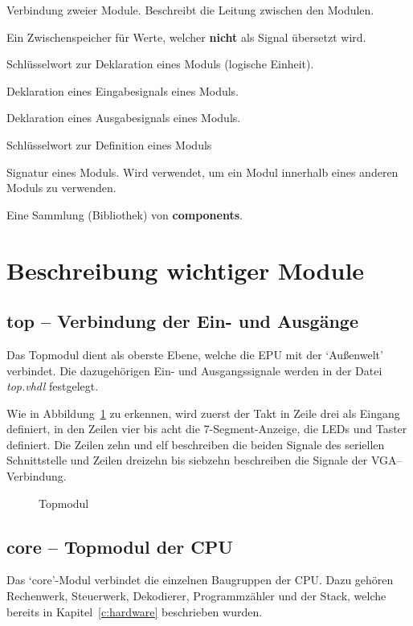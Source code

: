 \begin{description}[align=right, labelwidth=1.6cm]
\item[signal]		Verbindung zweier Module. Beschreibt die Leitung zwischen den
					Modulen.
\item[variable]		Ein Zwischenspeicher für Werte, welcher \textbf{nicht} als
					Signal übersetzt wird.
\item[entity]		Schlüsselwort zur Deklaration eines Moduls (logische Einheit).
\item[in]			Deklaration eines Eingabesignals eines Moduls.
\item[out]			Deklaration eines Ausgabesignals eines Moduls.
\item[architecture]	Schlüsselwort zur Definition eines Moduls
\item[component]	Signatur eines Moduls. Wird verwendet, um ein Modul
					innerhalb eines anderen Moduls zu verwenden.
\item[package]		Eine Sammlung (Bibliothek) von \textbf{components}.
\end{description}
\pagebreak
\section{Beschreibung wichtiger Module}
\subsection{top -- Verbindung der Ein- und Ausgänge}
\label{s:top}
Das Topmodul dient als oberste Ebene, welche die \ac{EPU} mit der `Außenwelt'
verbindet. Die dazugehörigen Ein- und Ausgangssignale werden in der Datei
\textit{top.vhdl} festgelegt.

Wie in Abbildung~\ref{code:top} zu erkennen, wird zuerst der Takt in Zeile drei als
Eingang definiert, in den Zeilen vier bis acht die 7-Segment-Anzeige, die LEDs
und Taster definiert. Die Zeilen zehn und elf beschreiben die beiden Signale des
seriellen Schnittstelle und Zeilen dreizehn bis siebzehn beschreiben die Signale
der VGA--Verbindung.
\begin{figure}[htb]

\caption{Topmodul}
\label{code:top}
\end{figure}
\pagebreak
\subsection{core -- Topmodul der CPU}
\label{s:core}
Das `core'-Modul verbindet die einzelnen Baugruppen der CPU\@. Dazu gehören
Rechenwerk, Steuerwerk, Dekodierer, Programmzähler und der Stack, welche bereits
in Kapitel~\ref{c:hardware} beschrieben wurden. 

